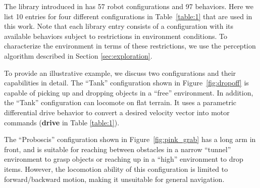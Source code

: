 \documentclass[journal]{IEEEtran}
\begin{document}
The library introduced in \cite{Jing2016} has 57 robot configurations and 97 behaviors.
Here we list 10 entries for four different configurations in Table~\ref{table:1} that are used in this work.
Note that each library entry consists of a configuration with its available behaviors subject to restrictions in environment conditions. To characterize the environment in terms of these restrictions, we use the perception algorithm described in Section \ref{sec:exploration}.

To provide an illustrative example, we discuss two configurations and their capabilities in detail.
The ``Tank'' configuration shown in Figure~\ref{fig:dropoff} is capable of picking
up and dropping objects in a ``free'' environment. In addition, the ``Tank'' configuration can locomote on flat terrain. It uses a parametric differential drive behavior to convert a desired velocity vector into motor commands (\textbf{drive} in Table \ref{table:1}).

The ``Proboscis'' configuration shown in Figure~\ref{fig:pink_grab} has
a long arm in front, and is suitable for reaching between obstacles in a narrow ``tunnel'' environment to grasp objects or reaching up in a ``high'' environment to drop items.
However, the locomotion ability of this configuration is limited to forward/backward
motion, making it unsuitable for general navigation.
\end{document}
